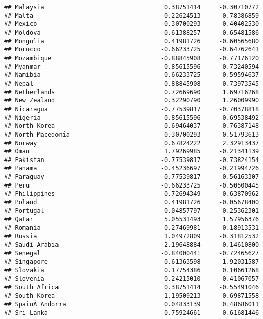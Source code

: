 \documentclass[
]{article}
\begin{document}
\begin{verbatim}
## Malaysia                                 0.38751414     -0.30710772
## Malta                                   -0.22624513      0.78386859
## Mexico                                  -0.30700293     -0.40402530
## Moldova                                 -0.61388257     -0.65481586
## Mongolia                                 0.41981726     -0.60565680
## Morocco                                 -0.66233725     -0.64762641
## Mozambique                              -0.88845908     -0.77176120
## Myanmar                                 -0.85615596     -0.73240594
## Namibia                                 -0.66233725     -0.59594637
## Nepal                                   -0.88845908     -0.73973545
## Netherlands                              0.72669690      1.69716268
## New Zealand                              0.32290790      1.26009990
## Nicaragua                               -0.77539817     -0.70378818
## Nigeria                                 -0.85615596     -0.69538492
## North Korea                             -0.69464037     -0.76387148
## North Macedonia                         -0.30700293     -0.51793613
## Norway                                   0.67824222      2.32913437
## Oman                                     1.79269985     -0.21341139
## Pakistan                                -0.77539817     -0.73824154
## Panama                                  -0.45236697     -0.21994726
## Paraguay                                -0.77539817     -0.56163307
## Peru                                    -0.66233725     -0.50500445
## Philippines                             -0.72694349     -0.63870962
## Poland                                   0.41981726     -0.05678400
## Portugal                                -0.04857797      0.25362301
## Qatar                                    5.05531493      1.57956376
## Romania                                 -0.27469981     -0.18913531
## Russia                                   1.04972809     -0.31812532
## Saudi Arabia                             2.19648884      0.14610800
## Senegal                                 -0.84000441     -0.72465627
## Singapore                                0.61363598      1.92031587
## Slovakia                                 0.17754386      0.10661268
## Slovenia                                 0.24215010      0.41067057
## South Africa                             0.38751414     -0.55491046
## South Korea                              1.19509213      0.69871558
## SpainÂ Andorra                           0.04833139      0.48686011
## Sri Lanka                               -0.75924661     -0.61681446

\end{verbatim}
\end{document}
